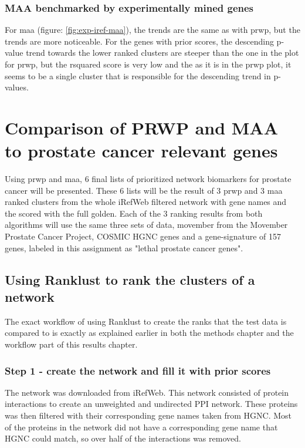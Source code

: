 \subsection{MAA benchmarked by experimentally mined genes}
For \gls{maa} (figure: \ref{fig:exp-iref-maa}), the trends are the same as with
\gls{prwp}, but the trends are more noticeable. For the genes with prior scores,
the descending p-value trend towards the lower ranked clusters are steeper than
the one in the plot for \gls{prwp}, but the \gls{rsquared} score is very low and
the as it is in the \gls{prwp} plot, it seems to be a single cluster that is
responsible for the descending trend in p-values.

\chapter{Comparison of PRWP and MAA to prostate cancer relevant genes}
Using \gls{prwp} and \gls{maa}, 6 final lists of prioritized network biomarkers
for prostate cancer will be presented. These 6 lists will be the result of
3 \gls{prwp} and 3 \gls{maa} ranked clusters from the whole iRefWeb filtered
network with gene names and the scored with the full \gls{golden}. Each of the
3 ranking results from both algorithms will use the same three sets of data,
\gls{movember} from the Movember Prostate Cancer Project, COSMIC HGNC
genes\cite{cosmic-download} and a gene-signature of 157
genes\cite{psa-overtreatment}, labeled in this assignment as "lethal prostate
cancer genes".

\section{Using Ranklust to rank the clusters of a network}
The exact workflow of using Ranklust to create the ranks that the test data is
compared to is exactly as explained earlier in both the methods chapter and the
workflow part of this results chapter.

\subsection{Step 1 - create the network and fill it with prior scores}
The network was downloaded from iRefWeb. This network consisted of protein
interactions to create an unweighted and undirected PPI network. These proteins
was then filtered with their corresponding gene names taken from HGNC. Most of
the proteins in the network did not have a corresponding gene name that HGNC
could match, so over half of the interactions was removed.

